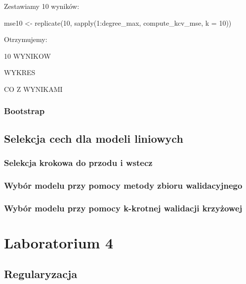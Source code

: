 \documentclass{article}
\begin{document}
Zestawiamy 10 wyników:
\begin{Rcode}
mse10 <- replicate(10, sapply(1:degree_max, compute_kcv_mse, k = 10))
\end{Rcode}
Otrzymujemy:
\begin{Rcode}
    10 WYNIKOW
\end{Rcode}
\begin{Rcode}
    WYKRES
\end{Rcode}
\begin{Rcode}
    CO Z WYNIKAMI
\end{Rcode}

\subsubsection{Bootstrap}
\begin{Rcode}

}
\end{Rcode}

\subsection{Selekcja cech dla modeli liniowych}
\subsubsection{Selekcja krokowa do przodu i wstecz}
\subsubsection{Wybór modelu przy pomocy metody zbioru walidacyjnego}
\subsubsection{Wybór modelu przy pomocy k-krotnej walidacji krzyżowej}

\section{Laboratorium 4}
\subsection{Regularyzacja}
\end{document}
